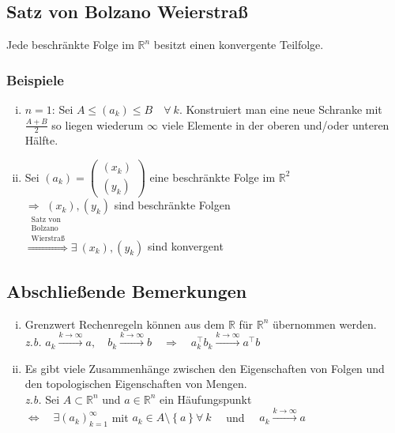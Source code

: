 \documentclass[11pt,a4paper]{book}
\newcommand {\R}	{\mathbb{R}}
\newcommand {\Rn}	{\mathbb{R}^n}
\newcommand{\1}    	{\mathbbm{1}}
\begin{document}
\subsection{Satz von Bolzano Weierstraß}
Jede beschränkte Folge im \(\Rn\) besitzt einen konvergente Teilfolge.

\subsubsection*{Beispiele}
\begin{enumerate}[(i)]
	\item \(n = 1\): Sei \( A \leqslant (a_k) \leqslant B \quad \forall~ k \). Konstruiert man eine neue Schranke mit \(\frac{A + B}{2} \) so liegen wiederum \(\infty\) viele Elemente in der oberen und/oder unteren Hälfte.
	\item Sei \((a_k) = \left( \begin{array}{c} (x_k) \\ (y_k) \end{array} \right) \) eine beschränkte Folge im \(\R^2\) \\
\(\Rightarrow\) \((x_k), (y_k)\) sind beschränkte Folgen \\
\(\stackrel{\substack{\textrm{Satz von}\\\textrm{Bolzano}\\\textrm{Wierstraß}}}{\Rightarrow} \exists~ (x_k), (y_k)\) sind konvergent
\end{enumerate}

\subsection{Abschließende Bemerkungen}
\begin{enumerate}[(i)]
	\item Grenzwert Rechenregeln können aus dem \(\R\) für \(\Rn\) übernommen werden. \\
	\textit{z.b.} \( a_k \stackrel{k \rightarrow \infty}{\rightarrow} a, \quad b_k \stackrel{k \rightarrow \infty}{\rightarrow} b 
	\quad \Rightarrow \quad a_k^\top b_k \stackrel{k \rightarrow \infty}{\rightarrow} a^\top b \)
	\item Es gibt viele Zusammenhänge zwischen den Eigenschaften von Folgen und den topologischen Eigenschaften von Mengen. \\
	\textit{z.b.} Sei \(A \subset \Rn\) und \(a \in \Rn\) ein Häufungspunkt \\
	\(\Leftrightarrow \quad \exists (a_k)_{k=1}^\infty \) mit \( a_k \in A \setminus \left\{ a \right\} \forall~ k \quad \) und \( \quad a_k \stackrel{k \rightarrow \infty}{\rightarrow} a\)
\end{enumerate}
\end{document}
